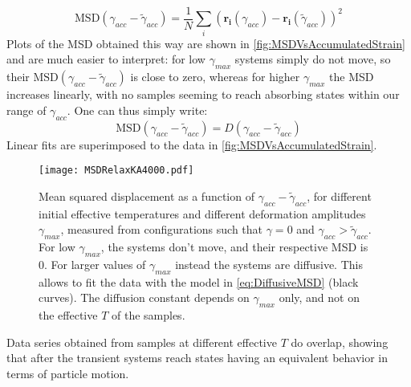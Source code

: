 \begin{equation}
	\text{MSD} (\gamma_{acc} - \widetilde{\gamma}_{acc}) = \frac{1}{N} \sum_{i}{(\mathbf{r_{i}}(\gamma_{acc}) - \mathbf{r_{i}}(\widetilde{\gamma}_{acc}))^{2}}
	\label{eq:MSDVsAccumulatedStrain}
\end{equation} 
Plots of the MSD obtained this way are shown in \autoref{fig:MSDVsAccumulatedStrain} and are much easier to interpret: for low $\gamma_{max}$ systems simply do not move, so their $\text{MSD} (\gamma_{acc} - \widetilde{\gamma}_{acc})$ is close to zero, whereas for higher $\gamma_{max}$ the MSD increases linearly, with no samples seeming to reach absorbing states within our range of $\gamma_{acc}$. One can thus simply write:
\begin{equation}
	\text{MSD} (\gamma_{acc} - \widetilde{\gamma}_{acc}) =  D (\gamma_{acc} - \widetilde{\gamma}_{acc})
	\label{eq:DiffusiveMSD}
\end{equation}
Linear fits are superimposed to the data in \autoref{fig:MSDVsAccumulatedStrain}.

\begin{figure}[!h] 
\centering 
\texttt{[image: MSDRelaxKA4000.pdf]} 
\caption{Mean squared displacement as a function of $\gamma_{acc} - \widetilde{\gamma}_{acc}$, for different initial effective temperatures and different deformation amplitudes $\gamma_{max}$, measured from configurations such that $\gamma=0$ and $\gamma_{acc} > \widetilde{\gamma}_{acc}$. For low $\gamma_{max}$, the systems don't move, and their respective MSD is 0. For larger values of $\gamma_{max}$ instead the systems are diffusive. This allows to fit the data with the model in \autoref{eq:DiffusiveMSD} (black curves). The diffusion constant depends on $\gamma_{max}$ only, and not on the effective $T$ of the samples.
\label{fig:MSDVsAccumulatedStrain}}
\end{figure}

Data series obtained from samples at different effective $T$ do overlap, showing that after the transient systems reach states having an equivalent behavior in terms of particle motion.

